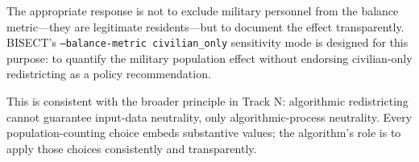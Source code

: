 The appropriate response is not to exclude military personnel from the balance metric---they are legitimate residents---but to document the effect transparently. BISECT's \texttt{--balance-metric civilian\_only} sensitivity mode is designed for this purpose: to quantify the military population effect without endorsing civilian-only redistricting as a policy recommendation.

This is consistent with the broader principle in Track N: algorithmic redistricting cannot guarantee input-data neutrality, only algorithmic-process neutrality. Every population-counting choice embeds substantive values; the algorithm's role is to apply those choices consistently and transparently.
